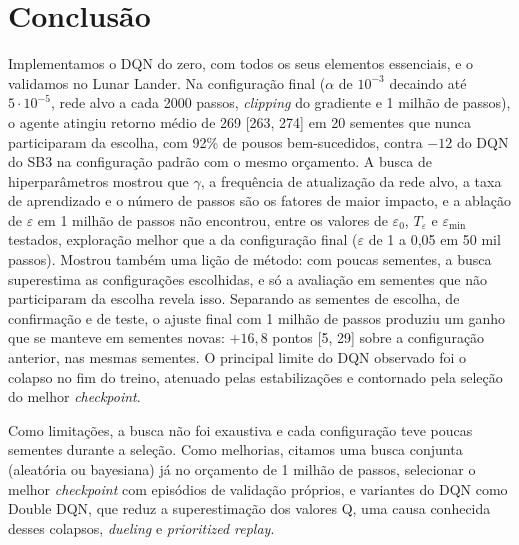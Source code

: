 \documentclass[conference]{IEEEtran}
\begin{document}
\section{Conclusão}
\label{sec:concl}
Implementamos o DQN do zero, com todos os seus elementos essenciais, e o validamos no Lunar Lander. Na configuração final ($\alpha$ de $10^{-3}$ decaindo até $5\cdot10^{-5}$, rede alvo a cada 2000 passos, \textit{clipping} do gradiente e 1 milhão de passos), o agente atingiu retorno médio de 269 [263, 274] em 20 sementes que nunca participaram da escolha, com 92\% de pousos bem-sucedidos, contra $-12$ do DQN do SB3 na configuração padrão com o mesmo orçamento. A busca de hiperparâmetros mostrou que $\gamma$, a frequência de atualização da rede alvo, a taxa de aprendizado e o número de passos são os fatores de maior impacto, e a ablação de $\varepsilon$ em 1 milhão de passos não encontrou, entre os valores de $\varepsilon_0$, $T_\varepsilon$ e $\varepsilon_{\min}$ testados, exploração melhor que a da configuração final ($\varepsilon$ de 1 a 0,05 em 50 mil passos). Mostrou também uma lição de método: com poucas sementes, a busca superestima as configurações escolhidas, e só a avaliação em sementes que não participaram da escolha revela isso. Separando as sementes de escolha, de confirmação e de teste, o ajuste final com 1 milhão de passos produziu um ganho que se manteve em sementes novas: $+16{,}8$ pontos [5, 29] sobre a configuração anterior, nas mesmas sementes. O principal limite do DQN observado foi o colapso no fim do treino, atenuado pelas estabilizações e contornado pela seleção do melhor \textit{checkpoint}.

Como limitações, a busca não foi exaustiva e cada configuração teve poucas sementes durante a seleção. Como melhorias, citamos uma busca conjunta (aleatória ou bayesiana) já no orçamento de 1 milhão de passos, selecionar o melhor \textit{checkpoint} com episódios de validação próprios, e variantes do DQN como Double DQN, que reduz a superestimação dos valores Q, uma causa conhecida desses colapsos, \textit{dueling} e \textit{prioritized replay}.




\end{document}
